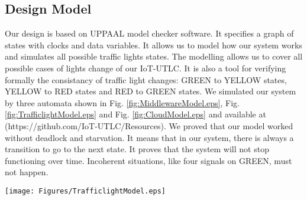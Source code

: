 




\subsection{Design Model}

Our design is based on UPPAAL model checker software. It specifies a graph of states with clocks and data variables. It allows us to model how our system works and simulates all possible traffic lights states. The modelling allows us to cover all possible cases of lights change of our IoT-UTLC. It is also a tool for verifying formally the consistancy of traffic light changes: GREEN to YELLOW states, YELLOW to RED states and RED to GREEN states.  
We simulated our system by three automata shown in Fig. \ref{fig:MiddlewareModel.eps}, Fig. \ref{fig:TrafficlightModel.eps} and Fig. \ref{fig:CloudModel.eps} and available at (https://github.com/IoT-UTLC/Resources).
We proved that our model worked without deadlock and starvation. It means that in our system, there is always a transition to go to the next state. It proves that the system will not stop functioning over time. Incoherent situations, like four signals on GREEN, must not happen.   




\begin{figure*}[!htb]
\centerline{\texttt{[image: Figures/TrafficlightModel.eps]}}
\caption{Model of our Traffic Lights in UPPAAL}
\label{fig:TrafficlightModel.eps}
\end{figure*}

